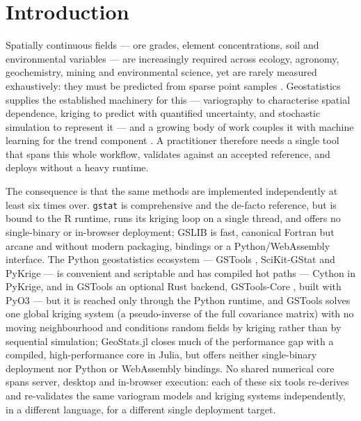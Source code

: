 \documentclass[preprint,12pt,authoryear]{elsarticle}
\begin{document}

\section{Introduction}
\label{sec:intro}

Spatially continuous fields --- ore grades, element concentrations, soil and
environmental variables --- are increasingly required across ecology, agronomy,
geochemistry, mining and environmental science, yet are rarely measured
exhaustively: they must be predicted from sparse point samples
\citep{li2021,goovaerts1997}. Geostatistics supplies the established machinery
for this --- variography to characterise spatial dependence, kriging to predict
with quantified uncertainty, and stochastic simulation to represent it --- and a
growing body of work couples it with machine learning for the trend component
\citep{hengl2018}. A practitioner therefore needs a single tool that spans this
whole workflow, validates against an accepted reference, and deploys without a
heavy runtime.

The consequence is that the same methods are implemented independently at
least six times over. \texttt{gstat} \citep{pebesma2004} is comprehensive and
the de-facto reference, but is bound to the \textsf{R} runtime, runs its kriging loop on a single
thread, and offers no single-binary or in-browser deployment; GSLIB
\citep{deutsch1998} is fast, canonical Fortran but arcane and without modern
packaging, bindings or a Python/WebAssembly interface. The Python
geostatistics ecosystem --- GSTools \citep{mueller2022}, SciKit-GStat
\citep{maelicke2022} and PyKrige \citep{pykrige} --- is convenient and scriptable and has compiled hot paths --- Cython in PyKrige,
and in GSTools an optional Rust backend, GSTools-Core \citep{gstoolscore},
built with PyO3 --- but it is reached only through the Python runtime, and
GSTools solves one global kriging system (a pseudo-inverse of the full
covariance matrix) with no moving neighbourhood and conditions random fields by
kriging rather than by sequential simulation;
GeoStats.jl \citep{hoffimann2018} closes much of the performance gap with a
compiled, high-performance core in Julia, but offers neither single-binary
deployment nor Python or WebAssembly bindings. No shared numerical core spans
server, desktop and in-browser execution: each of these six tools re-derives
and re-validates the same variogram models and kriging systems independently,
in a different language, for a different single deployment target.
\end{document}

